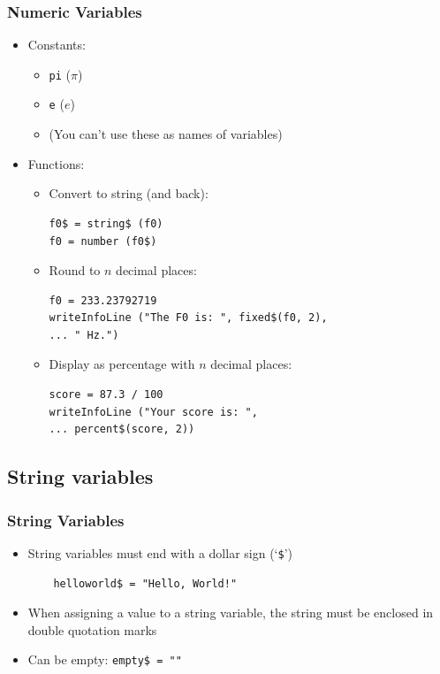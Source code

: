 \documentclass[handout]{beamer}
\begin{document}
\begin{frame}[fragile]
\frametitle{Numeric Variables}
\begin{itemize}
    \item <1-> Constants:
    \begin{itemize}
        \item \texttt{pi} ($\pi$)
        \item \texttt{e} ($e$)
        \item (You can't use these as names of variables)
    \end{itemize}

    \item <2-> Functions:
    \begin{itemize}
        \item Convert to string (and back):
        \begin{verbatim}f0$ = string$ (f0)
f0 = number (f0$)
        \end{verbatim}

        \item Round to $n$ decimal places:
        \begin{verbatim}f0 = 233.23792719
writeInfoLine ("The F0 is: ", fixed$(f0, 2),
... " Hz.")
        \end{verbatim}

        \item Display as percentage with $n$ decimal places:
        \begin{verbatim}score = 87.3 / 100
writeInfoLine ("Your score is: ",
... percent$(score, 2))
        \end{verbatim}
    \end{itemize}
\end{itemize}
\end{frame}

\subsection{String variables}

\begin{frame}[fragile]
\frametitle{String Variables}
\begin{itemize}
    \item <1-> String variables must end with a dollar sign (`\texttt{\$}')
    \begin{verbatim}
    helloworld$ = "Hello, World!"
    \end{verbatim}

    \item <1-> When assigning a value to a string variable, the string must be enclosed in double quotation marks

    \item <1-> Can be empty: \texttt{empty\$ = ""}
\end{itemize}
\end{frame}
\end{document}
